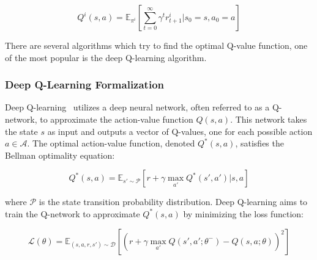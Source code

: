 \documentclass[sigconf]{acmart}
\begin{document}
\[ Q^i(s, a) = \mathbb{E}_{\pi^i} \left[ \sum_{t=0}^{\infty} \gamma^t r^i_{t+1} | s_0 = s, a_0 = a \right] \]



There are several algorithms which try to find the optimal Q-value function, one of the most popular is the deep Q-learning algorithm.
\subsubsection{Deep Q-Learning Formalization}
Deep Q-learning~\cite{DBLP:conf/l4dc/FanWXY20} utilizes a deep neural network, 
often referred to as a Q-network, to approximate the action-value function $Q(s, a)$. 
This network takes the state $s$ as input and outputs a vector of Q-values, one for each possible action $a \in \mathcal{A}$.  
The optimal action-value function, denoted $Q^*(s, a)$, satisfies the Bellman optimality equation:

\[ Q^*(s, a) = \mathbb{E}_{s' \sim \mathcal{P}} \left[ r + \gamma \max_{a'} Q^*(s', a') | s, a \right] \]

where $\mathcal{P}$ is the state transition probability distribution.  
Deep Q-learning aims to train the Q-network to approximate $Q^*(s, a)$ by minimizing the loss function:

\[ \mathcal{L}(\theta) = \mathbb{E}_{(s, a, r, s') \sim \mathcal{D}} \left[ \left( r + \gamma \max_{a'} Q(s', a'; \theta^-) - Q(s, a; \theta) \right)^2 \right] \]
\end{document}
